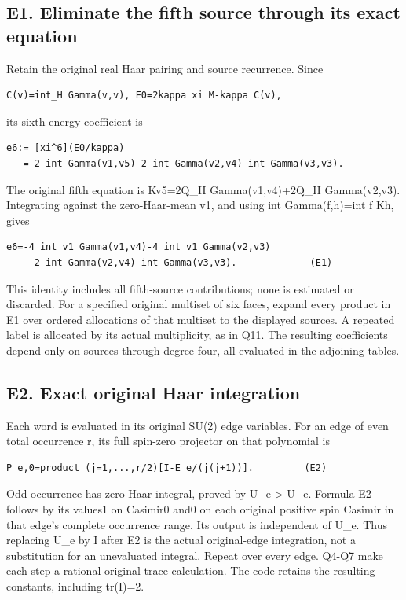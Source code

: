 \documentclass[11pt,a4paper]{article}
\newcounter{none}
\renewcommand{\[}{\begingroup\small\originaldisplaystart}
\renewcommand{\]}{\originaldisplayend\endgroup}
\begin{document}
\subsection{E1. Eliminate the fifth source through its exact
equation}\label{e1.-eliminate-the-fifth-source-through-its-exact-equation}

Retain the original real Haar pairing and source recurrence. Since

\begin{verbatim}
C(v)=int_H Gamma(v,v), E0=2kappa xi M-kappa C(v),
\end{verbatim}

its sixth energy coefficient is

\begin{verbatim}
e6:= [xi^6](E0/kappa)
   =-2 int Gamma(v1,v5)-2 int Gamma(v2,v4)-int Gamma(v3,v3).
\end{verbatim}

The original fifth equation is Kv5=2Q\_H Gamma(v1,v4)+2Q\_H
Gamma(v2,v3). Integrating against the zero-Haar-mean v1, and using int
Gamma(f,h)=int f Kh, gives

\begin{verbatim}
e6=-4 int v1 Gamma(v1,v4)-4 int v1 Gamma(v2,v3)
    -2 int Gamma(v2,v4)-int Gamma(v3,v3).             (E1)
\end{verbatim}

This identity includes all fifth-source contributions; none is estimated
or discarded. For a specified original multiset of six faces, expand
every product in E1 over ordered allocations of that multiset to the
displayed sources. A repeated label is allocated by its actual
multiplicity, as in Q11. The resulting coefficients depend only on
sources through degree four, all evaluated in the adjoining tables.

\subsection{E2. Exact original Haar
integration}\label{e2.-exact-original-haar-integration}

Each word is evaluated in its original SU(2) edge variables. For an edge
of even total occurrence r, its full spin-zero projector on that
polynomial is

\begin{verbatim}
P_e,0=product_(j=1,...,r/2)[I-E_e/(j(j+1))].         (E2)
\end{verbatim}

Odd occurrence has zero Haar integral, proved by U\_e-\textgreater-U\_e.
Formula E2 follows by its values1 on Casimir0 and0 on each original
positive spin Casimir in that edge's complete occurrence range. Its
output is independent of U\_e. Thus replacing U\_e by I after E2 is the
actual original-edge integration, not a substitution for an unevaluated
integral. Repeat over every edge. Q4-Q7 make each step a rational
original trace calculation. The code retains the resulting constants,
including tr(I)=2.
\end{document}
